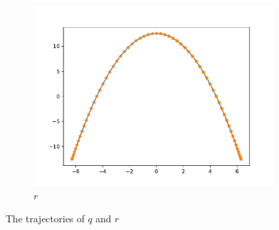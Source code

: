 \begin{figure}[b]
\begin{subfigure}[t]{0.5\textwidth}
        \centering
        \includegraphics[width=\linewidth]{figures/curve_1/curve_r.pdf}
        \caption{\(r\)}\label{fig:curve_1_r}
    \end{subfigure}
    \caption{The trajectories of \(q\) and \(r\)}\label{fig:curve_1}
\end{figure}


